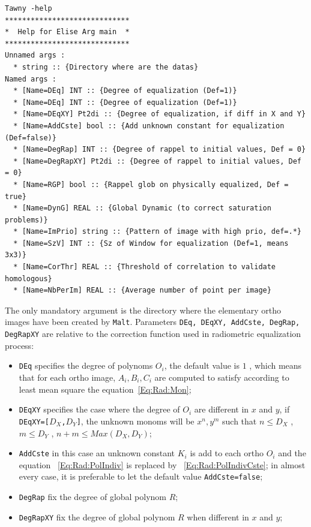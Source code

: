 \begin{verbatim}
Tawny -help
*****************************
*  Help for Elise Arg main  *
*****************************
Unnamed args :
  * string :: {Directory where are the datas}
Named args :
  * [Name=DEq] INT :: {Degree of equalization (Def=1)}
  * [Name=DEq] INT :: {Degree of equalization (Def=1)}
  * [Name=DEqXY] Pt2di :: {Degree of equalization, if diff in X and Y}
  * [Name=AddCste] bool :: {Add unknown constant for equalization (Def=false)}
  * [Name=DegRap] INT :: {Degree of rappel to initial values, Def = 0}
  * [Name=DegRapXY] Pt2di :: {Degree of rappel to initial values, Def = 0}
  * [Name=RGP] bool :: {Rappel glob on physically equalized, Def = true}
  * [Name=DynG] REAL :: {Global Dynamic (to correct saturation problems)}
  * [Name=ImPrio] string :: {Pattern of image with high prio, def=.*}
  * [Name=SzV] INT :: {Sz of Window for equalization (Def=1, means 3x3)}
  * [Name=CorThr] REAL :: {Threshold of correlation to validate homologous}
  * [Name=NbPerIm] REAL :: {Average number of point per image}
\end{verbatim}

The only mandatory argument is the directory where the
elementary ortho images have been created by {\tt Malt}. Parameters
{\tt DEq, DEqXY, AddCste, DegRap, DegRapXY} are relative to the correction
function used in radiometric equalization process:

\begin{itemize}
  \item {\tt DEq} specifies the degree of polynoms $O_i$, the default value is
	$1$ , which means that for each ortho image, $A_i,B_i,C_i$ are computed
	to satisfy according to least mean square the equation~\ref{Eq:Rad:Mon};

   \item {\tt DEqXY} specifies the case where the degree of $O_i$ are different in
	 $x$ and $y$, if  {\tt DEqXY=[$D_X$,$D_Y$]}, the unknown monoms will
	 be $x^n,y^m$ such that $n\leq D_X$ , $m\leq D_Y$ ,   $n+m\leq Max(D_X,D_Y)$;

   \item {\tt AddCste} in this case an unknown constant $K_i$ is add to each ortho $O_i$ and
	  the equation ~\ref{Eq:Rad:PolIndiv} is replaced by ~\ref{Eq:Rad:PolIndivCste};
	  in almost every case, it is preferable to let the default value {\tt AddCste=false};

   \item {\tt DegRap} fix the degree of global polynom $R$;

   \item {\tt DegRapXY} fix the degree of global polynom $R$ when different in $x$ and $y$;

\end{itemize}




